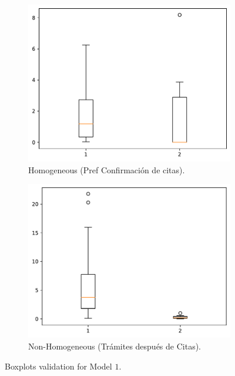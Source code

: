 \begin{figure}[H]
        \centering
        \begin{subfigure}[b]{0.475\textwidth}
            \centering
            \includegraphics[scale=0.5]{files/test-for-wednesday-for-type-pref-confirmacion-de-citas.pdf}
            \caption{Homogeneous (Pref Confirmación de citas).}
            \label{fig:model_1_homo}
        \end{subfigure}
        \begin{subfigure}[b]{0.475\textwidth}   
            \centering 
            \includegraphics[scale=0.5]{files/test-for-wednesday-for-type-tramites-despues-de-citas.pdf}
            \caption{Non-Homogeneous (Trámites después de Citas).}
            \label{fig:model_1_no_homo}
        \end{subfigure}
        \caption{Boxplots validation for Model $1$.}
        \label{fig:model_1_vali}
\end{figure}


